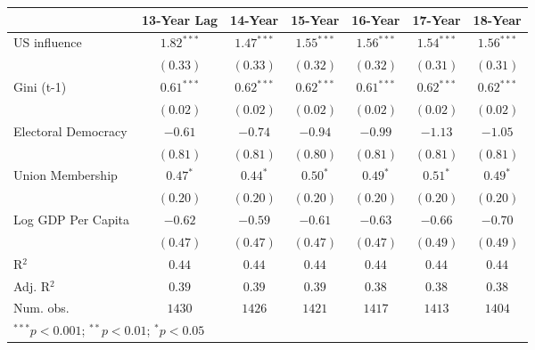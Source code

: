 
\begin{table}
\begin{center}
\begin{tabular}{l c c c c c c}
\toprule
 & 13-Year Lag & 14-Year & 15-Year & 16-Year & 17-Year & 18-Year \\
\midrule
US influence        & $\mathbf{1.82}^{***}$ & $\mathbf{1.47}^{***}$ & $\mathbf{1.55}^{***}$ & $\mathbf{1.56}^{***}$ & $\mathbf{1.54}^{***}$ & $\mathbf{1.56}^{***}$ \\
                    & $(0.33)$              & $(0.33)$              & $(0.32)$              & $(0.32)$              & $(0.31)$              & $(0.31)$              \\
Gini (t-1)          & $\mathbf{0.61}^{***}$ & $\mathbf{0.62}^{***}$ & $\mathbf{0.62}^{***}$ & $\mathbf{0.61}^{***}$ & $\mathbf{0.62}^{***}$ & $\mathbf{0.62}^{***}$ \\
                    & $(0.02)$              & $(0.02)$              & $(0.02)$              & $(0.02)$              & $(0.02)$              & $(0.02)$              \\
Electoral Democracy & $-0.61$               & $-0.74$               & $-0.94$               & $-0.99$               & $-1.13$               & $-1.05$               \\
                    & $(0.81)$              & $(0.81)$              & $(0.80)$              & $(0.81)$              & $(0.81)$              & $(0.81)$              \\
Union Membership    & $\mathbf{0.47}^{*}$   & $\mathbf{0.44}^{*}$   & $\mathbf{0.50}^{*}$   & $\mathbf{0.49}^{*}$   & $\mathbf{0.51}^{*}$   & $\mathbf{0.49}^{*}$   \\
                    & $(0.20)$              & $(0.20)$              & $(0.20)$              & $(0.20)$              & $(0.20)$              & $(0.20)$              \\
Log GDP Per Capita  & $-0.62$               & $-0.59$               & $-0.61$               & $-0.63$               & $-0.66$               & $-0.70$               \\
                    & $(0.47)$              & $(0.47)$              & $(0.47)$              & $(0.47)$              & $(0.49)$              & $(0.49)$              \\
\midrule
R$^2$               & $0.44$                & $0.44$                & $0.44$                & $0.44$                & $0.44$                & $0.44$                \\
Adj. R$^2$          & $0.39$                & $0.39$                & $0.39$                & $0.38$                & $0.38$                & $0.38$                \\
Num. obs.           & $1430$                & $1426$                & $1421$                & $1417$                & $1413$                & $1404$                \\
\bottomrule
\multicolumn{7}{l}{\scriptsize{$^{***}p<0.001$; $^{**}p<0.01$; $^{*}p<0.05$}}
\end{tabular}
\label{table:coefficients}
\end{center}
\end{table}
